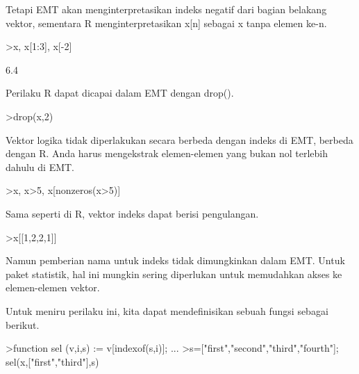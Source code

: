 \documentclass[a4paper,10pt]{article}
\begin{document}
\begin{eulernotebook}
\begin{eulercomment}
\begin{eulercomment}
\begin{eulercomment}
\begin{eulercomment}
\begin{eulercomment}
Tetapi EMT akan menginterpretasikan indeks negatif dari bagian
belakang vektor, sementara R menginterpretasikan x[n] sebagai x tanpa
elemen ke-n.
\end{eulercomment}
\begin{eulerprompt}
>x, x[1:3], x[-2]
\end{eulerprompt}
\begin{euleroutput}
  [10.4,  5.6,  3.1,  6.4,  21.7]
  [10.4,  5.6,  3.1]
  6.4
\end{euleroutput}
\begin{eulercomment}
Perilaku R dapat dicapai dalam EMT dengan drop().
\end{eulercomment}
\begin{eulerprompt}
>drop(x,2)
\end{eulerprompt}
\begin{euleroutput}
  [10.4,  3.1,  6.4,  21.7]
\end{euleroutput}
\begin{eulercomment}
Vektor logika tidak diperlakukan secara berbeda dengan indeks di EMT,
berbeda dengan R. Anda harus mengekstrak elemen-elemen yang bukan nol
terlebih dahulu di EMT.
\end{eulercomment}
\begin{eulerprompt}
>x, x>5, x[nonzeros(x>5)]
\end{eulerprompt}
\begin{euleroutput}
  [10.4,  5.6,  3.1,  6.4,  21.7]
  [1,  1,  0,  1,  1]
  [10.4,  5.6,  6.4,  21.7]
\end{euleroutput}
\begin{eulercomment}
Sama seperti di R, vektor indeks dapat berisi pengulangan.
\end{eulercomment}
\begin{eulerprompt}
>x[[1,2,2,1]]
\end{eulerprompt}
\begin{euleroutput}
  [10.4,  5.6,  5.6,  10.4]
\end{euleroutput}
\begin{eulercomment}
Namun pemberian nama untuk indeks tidak dimungkinkan dalam EMT. Untuk
paket statistik, hal ini mungkin sering diperlukan untuk memudahkan
akses ke elemen-elemen vektor.

Untuk meniru perilaku ini, kita dapat mendefinisikan sebuah fungsi
sebagai berikut.
\end{eulercomment}
\begin{eulerprompt}
>function sel (v,i,s) := v[indexof(s,i)]; ...
>s=["first","second","third","fourth"]; sel(x,["first","third"],s)
\end{eulerprompt}
\begin{euleroutput}
  

\end{euleroutput}
\end{eulercomment}
\end{eulercomment}
\end{eulercomment}
\end{eulercomment}
\end{eulernotebook}
\end{document}
